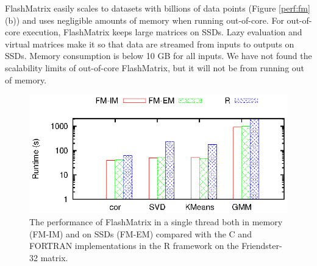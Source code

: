 
FlashMatrix easily scales to datasets with billions of data points
(Figure \ref{perf:fm}(b)) and uses negligible amounts of memory when running out-of-core.
For out-of-core execution, FlashMatrix keeps large matrices on
SSDs.  %
Lazy evaluation and virtual matrices make it so that data are streamed from inputs to outputs
  on SSDs.  Memory consumption is below 10 GB for all inputs.
We have not found the scalability limits of out-of-core FlashMatrix, but it will not be 
from running out of memory.

\begin{figure}
	\begin{center}
		\footnotesize
		\includegraphics{FlashMatrix_figs/FM-vs-R.eps}
		\caption{The performance of FlashMatrix in a single thread both in
			memory (FM-IM) and on SSDs (FM-EM) compared with the C and FORTRAN
		implementations in the R framework on the Friendster-32 matrix.}
		\label{fig:fmR}
	\end{center}
\end{figure}

